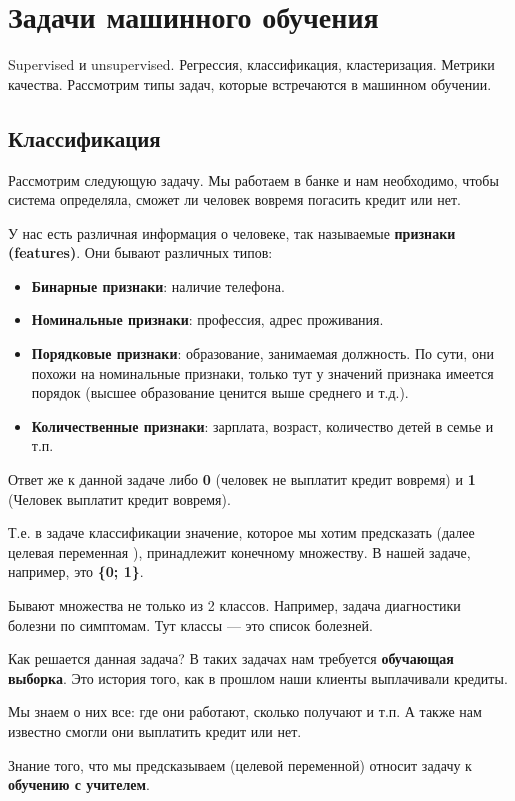 \section{Задачи машинного обучения}
Supervised и unsupervised. Регрессия, классификация, кластеризация. Метрики качества.
Рассмотрим типы задач, которые встречаются в машинном обучении.

\subsection{Классификация}
Рассмотрим следующую задачу. Мы работаем в банке и нам необходимо, чтобы система определяла, сможет ли человек вовремя погасить кредит или нет. 

У нас есть различная информация о человеке, так называемые \textbf{признаки (features)}. Они бывают различных типов:
\begin{itemize}
    \item \textbf{Бинарные признаки}: наличие телефона.
    \item \textbf{Номинальные признаки}: профессия, адрес проживания.
    \item \textbf{Порядковые признаки}: образование, занимаемая должность. По сути, они похожи на номинальные признаки, только тут у значений признака имеется порядок (высшее образование ценится выше среднего и т.д.).
    \item \textbf{Количественные признаки}: зарплата, возраст, количество детей в семье и т.п.
\end{itemize}

Ответ же к данной задаче либо \textbf{0} (человек не выплатит кредит вовремя) и \textbf{1} (Человек выплатит кредит вовремя).

Т.е. в задаче классификации значение, которое мы хотим предсказать (далее целевая переменная ), принадлежит конечному множеству. В нашей задаче, например, это \textbf{\{0; 1\}}. 

Бывают множества не только из 2 классов. Например, задача диагностики болезни по симптомам. Тут классы — это список болезней.

Как решается данная задача? В таких задачах нам требуется \textbf{обучающая выборка}. Это история того, как в прошлом наши клиенты выплачивали кредиты.

Мы знаем о них все: где они работают, сколько получают и т.п. А также нам известно смогли они выплатить кредит или нет. 

Знание того, что мы предсказываем (целевой переменной) относит задачу к \textbf{обучению с учителем}.

